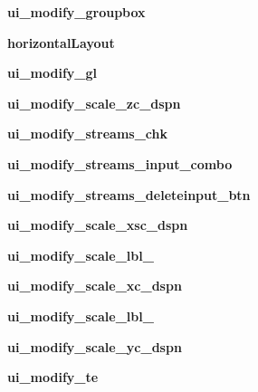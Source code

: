 \begin{DoxyCompactItemize}
\hypertarget{a00077_aa645e27296dab9e5638379386ea917e8}{}\label{a00077_aa645e27296dab9e5638379386ea917e8} 
{\bfseries ui\+\_\+modify\+\_\+groupbox}
\item 
\hypertarget{a00077_a26736563b6a21e18aa6259ad090095f6}{}\label{a00077_a26736563b6a21e18aa6259ad090095f6} 
{\bfseries horizontal\+Layout}
\item 
\hypertarget{a00077_adbd7e377be21c4d3b65945e822f6d16a}{}\label{a00077_adbd7e377be21c4d3b65945e822f6d16a} 
{\bfseries ui\+\_\+modify\+\_\+gl}
\item 
\hypertarget{a00077_a45676686abc65792ca2563bc755bf1fc}{}\label{a00077_a45676686abc65792ca2563bc755bf1fc} 
{\bfseries ui\+\_\+modify\+\_\+scale\+\_\+zc\+\_\+dspn}
\item 
\hypertarget{a00077_a6d932026d0608e9101dc635e53e14b39}{}\label{a00077_a6d932026d0608e9101dc635e53e14b39} 
{\bfseries ui\+\_\+modify\+\_\+streams\+\_\+chk}
\item 
\hypertarget{a00077_aa5c75d1179f2057b2870faeb125ba159}{}\label{a00077_aa5c75d1179f2057b2870faeb125ba159} 
{\bfseries ui\+\_\+modify\+\_\+streams\+\_\+input\+\_\+combo}
\item 
\hypertarget{a00077_a975e1c1c7915c37fc9a24064f29b0ba6}{}\label{a00077_a975e1c1c7915c37fc9a24064f29b0ba6} 
{\bfseries ui\+\_\+modify\+\_\+streams\+\_\+deleteinput\+\_\+btn}
\item 
\hypertarget{a00077_a8a7176b6c27c85fb33c76775294b0b80}{}\label{a00077_a8a7176b6c27c85fb33c76775294b0b80} 
{\bfseries ui\+\_\+modify\+\_\+scale\+\_\+xsc\+\_\+dspn}
\item 
\hypertarget{a00077_a86a79f9b08cfaf52544470b8392b2978}{}\label{a00077_a86a79f9b08cfaf52544470b8392b2978} 
{\bfseries ui\+\_\+modify\+\_\+scale\+\_\+lbl\+\_}
\item 
\hypertarget{a00077_ae36e5bd681ee713671843137c9328bc6}{}\label{a00077_ae36e5bd681ee713671843137c9328bc6} 
{\bfseries ui\+\_\+modify\+\_\+scale\+\_\+xc\+\_\+dspn}
\item 
\hypertarget{a00077_a69a6abf1b7b08db89a7a0f640590d037}{}\label{a00077_a69a6abf1b7b08db89a7a0f640590d037} 
{\bfseries ui\+\_\+modify\+\_\+scale\+\_\+lbl\+\_}
\item 
\hypertarget{a00077_a66b3b327058352a8f531970b3e41bf6f}{}\label{a00077_a66b3b327058352a8f531970b3e41bf6f} 
{\bfseries ui\+\_\+modify\+\_\+scale\+\_\+yc\+\_\+dspn}
\item 
\hypertarget{a00077_aefc951ed87303c4d5f2a3c5801b17441}{}\label{a00077_aefc951ed87303c4d5f2a3c5801b17441} 
{\bfseries ui\+\_\+modify\+\_\+te}
\item 

\end{DoxyCompactItemize}
